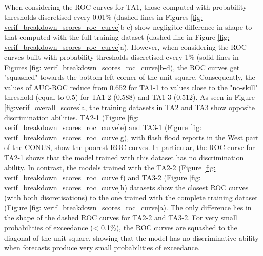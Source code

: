 When  considering the ROC curves for TA1, those computed with probability thresholds discretised every 0.01\% (dashed lines in Figures \ref{fig: verif_breakdown_scores_roc_curve}b-c) show negligible difference in shape to that computed with the full training dataset (dashed line in Figure \ref{fig: verif_breakdown_scores_roc_curve}a). However, when considering the ROC curves built with probability thresholds discretised every 1\% (solid lines in Figures \ref{fig: verif_breakdown_scores_roc_curve}b-d), the ROC curves get "squashed" towards the bottom-left corner of the unit square. Consequently, the values of AUC-ROC reduce from 0.652 for TA1-1 to values close to the "no-skill" threshold (equal to 0.5) for TA1-2 (0.588) and TA1-3 (0.512). As seen in Figure \ref{fig:verif_overall_scores}a, the training datasets in TA2 and TA3 show opposite discrimination abilities. TA2-1 (Figure \ref{fig: verif_breakdown_scores_roc_curve}e) and TA3-1 (Figure \ref{fig: verif_breakdown_scores_roc_curve}g), with flash flood reports in the West part of the CONUS, show the poorest ROC curves. In particular, the ROC curve for TA2-1 shows that the model trained with this dataset has no discrimination ability. In contrast, the models trained with the TA2-2 (Figure \ref{fig: verif_breakdown_scores_roc_curve}f) and TA3-2 (Figure \ref{fig: verif_breakdown_scores_roc_curve}h) datasets show the closest ROC curves (with both discretisations) to the one trained with the complete training dataset (Figure \ref{fig: verif_breakdown_scores_roc_curve}a). The only difference lies in the shape of the dashed ROC curves for TA2-2 and TA3-2. For very small probabilities of exceedance (< 0.1\%), the ROC curves are squashed to the diagonal of the unit square, showing that the model has no discriminative ability when forecasts produce very small probabilities of exceedance. 

